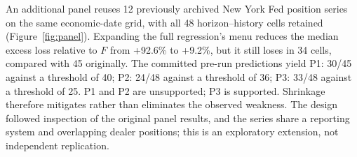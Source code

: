 

An additional panel reuses 12 previously archived New York Fed position series on the same economic-date grid, with all 48 horizon--history cells retained (Figure~\ref{fig:panel}). Expanding the full regression's menu reduces the median excess loss relative to $F$ from +92.6\% to +9.2\%, but it still loses in 34 cells, compared with 45 originally. The committed pre-run predictions yield P1: 30/45 against a threshold of 40; P2: 24/48 against a threshold of 36; P3: 33/48 against a threshold of 25. P1 and P2 are unsupported; P3 is supported. Shrinkage therefore mitigates rather than eliminates the observed weakness. The design followed inspection of the original panel results, and the series share a reporting system and overlapping dealer positions; this is an exploratory extension, not independent replication.
